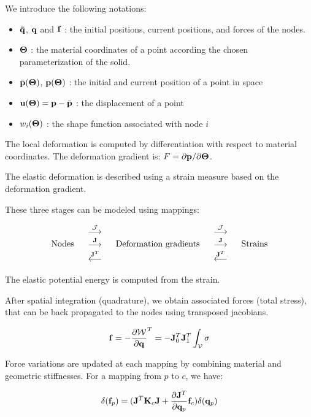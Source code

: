 We introduce the following notations:
\begin{itemize}
 \item $\mathbf{{\bar{q}}}$, $\mathbf{{q}}$ and $\mathbf{{f}}$ : the initial positions, current positions, and forces of the nodes.
 \item $\mathbf{{\Theta}}$ : the material coordinates of a point according the chosen parameterization of the solid.
 \item $\bar{\mathbf{{p}}}(\mathbf{{\Theta}})$, $\mathbf{{p}} (\mathbf{{\Theta}})$ : the initial and current position of a point in space
 \item $\mathbf{{u}} (\mathbf{{\Theta}}) =\mathbf{{p}}-\bar{\mathbf{{p}}}$ : the displacement of a point
 \item $w_i(\mathbf{{\Theta}})$ : the shape function associated with node $i$
\end{itemize}

The local deformation is computed by differentiation with respect to material coordinates. The deformation gradient is: $F = \partial \mathbf{{p}} / \partial \mathbf{{\Theta}}$.

The elastic deformation is described using a strain measure based on the deformation gradient. 

These three stages can be modeled using \sofa{} mappings:

\begin{equation}
\left. \begin{array}{ccccc}
\mbox{Nodes}  & \left. \begin{array}{c} \stackrel{\mathbf{\mathcal{J}}}{\longrightarrow} \\ \stackrel{\mathbf{{J}}}{\longrightarrow} \\ \stackrel{\mathbf{{J}}^T}{\longleftarrow} \end{array}\right. &   \mbox{Deformation gradients} & \left. \begin{array}{c} \stackrel{\mathbf{\mathcal{J}}}{\longrightarrow} \\ \stackrel{\mathbf{{J}}}{\longrightarrow} \\ \stackrel{\mathbf{{J}}^T}{\longleftarrow} \end{array}\right. &  \mbox{Strains}
\end{array}\right. 
\end{equation}

The elastic potential energy is computed from the strain. 

After spatial integration (quadrature), we obtain associated forces (total stress), that can be back propagated to the nodes using transposed jacobians.

\begin{equation}\label{eq:f}
 \mathbf{{\mathbf{{f}}}} = - \frac{\partial \mathcal{W}}{\partial \mathbf{{q}}}^T =  - \mathbf{{J}}^T_0\mathbf{{J}}^T_1 \int_{\mathcal{V}} \sigma
\end{equation}

Force variations are updated at each mapping by combining material and geometric stiffnesses. For a mapping from $p$ to $c$, we have:

\begin{equation}
 \delta(\mathbf{{\mathbf{{f}}}}_p) = ( \mathbf{{J}}^T \mathbf{{K}}_c \mathbf{{J}} + \frac{\partial \mathbf{{J}}^T}{\partial \mathbf{{q}}_p} \mathbf{{\mathbf{{f}}}}_c ) \delta(\mathbf{{q}}_p) 
\end{equation}

